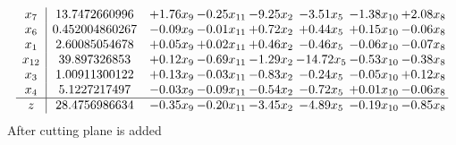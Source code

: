 \documentclass[8pt]{article}
\begin{document}
\[\begin{array}{c| c c@{\hskip 2pt} c@{\hskip 2pt} c@{\hskip 2pt} c@{\hskip 2pt} c@{\hskip 2pt} c@{\hskip 2pt} }
 x_{7}   &  13.7472660996 & +  1.76 x_{9} & -0.25 x_{11} & -9.25 x_{2} & -3.51 x_{5} & -1.38 x_{10} & +  2.08 x_{8}\\
 x_{6}   &  0.452004860267 & -0.09 x_{9} & -0.01 x_{11} & +  0.72 x_{2} & +  0.44 x_{5} & +  0.15 x_{10} & -0.06 x_{8}\\
 x_{1}   &  2.60085054678 & +  0.05 x_{9} & +  0.02 x_{11} & +  0.46 x_{2} & -0.46 x_{5} & -0.06 x_{10} & -0.07 x_{8}\\
 x_{12}   &  39.897326853 & +  0.12 x_{9} & -0.69 x_{11} & -1.29 x_{2} & -14.72 x_{5} & -0.53 x_{10} & -0.38 x_{8}\\
 x_{3}   &  1.00911300122 & +  0.13 x_{9} & -0.03 x_{11} & -0.83 x_{2} & -0.24 x_{5} & -0.05 x_{10} & +  0.12 x_{8}\\
 x_{4}   &  5.1227217497 & -0.03 x_{9} & -0.09 x_{11} & -0.54 x_{2} & -0.72 x_{5} & +  0.01 x_{10} & -0.06 x_{8}\\
\hline
z    &  28.4756986634 & -0.35 x_{9} & -0.20 x_{11} & -3.45 x_{2} & -4.89 x_{5} & -0.19 x_{10} & -0.85 x_{8}\\
\end{array}\]
 After cutting plane is added 
\end{document}
